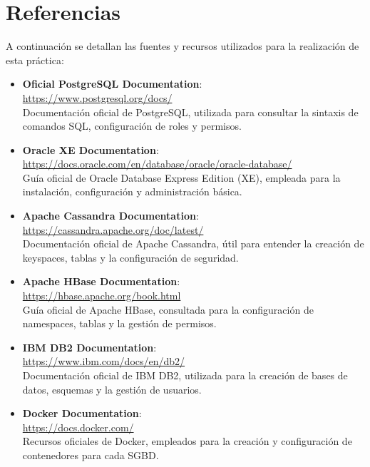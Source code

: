 \documentclass{article}
\begin{document}
\section{Referencias}

A continuación se detallan las fuentes y recursos utilizados para la realización de esta práctica:

\begin{itemize}
    \item \textbf{Oficial PostgreSQL Documentation}: \\
    \url{https://www.postgresql.org/docs/} \\
    Documentación oficial de PostgreSQL, utilizada para consultar la sintaxis de comandos SQL, configuración de roles y permisos.

    \item \textbf{Oracle XE Documentation}: \\
    \url{https://docs.oracle.com/en/database/oracle/oracle-database/} \\
    Guía oficial de Oracle Database Express Edition (XE), empleada para la instalación, configuración y administración básica.

    \item \textbf{Apache Cassandra Documentation}: \\
    \url{https://cassandra.apache.org/doc/latest/} \\
    Documentación oficial de Apache Cassandra, útil para entender la creación de keyspaces, tablas y la configuración de seguridad.

    \item \textbf{Apache HBase Documentation}: \\
    \url{https://hbase.apache.org/book.html} \\
    Guía oficial de Apache HBase, consultada para la configuración de namespaces, tablas y la gestión de permisos.

    \item \textbf{IBM DB2 Documentation}: \\
    \url{https://www.ibm.com/docs/en/db2/} \\
    Documentación oficial de IBM DB2, utilizada para la creación de bases de datos, esquemas y la gestión de usuarios.

    \item \textbf{Docker Documentation}: \\
    \url{https://docs.docker.com/} \\
    Recursos oficiales de Docker, empleados para la creación y configuración de contenedores para cada SGBD.


\end{itemize}
\end{document}
